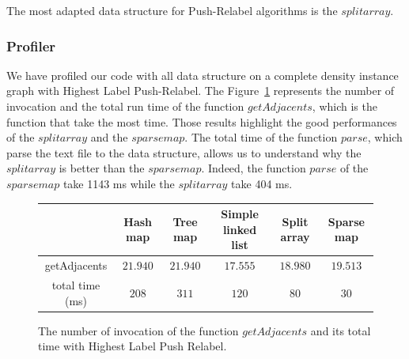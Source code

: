 The most adapted data structure for Push-Relabel algorithms is the $split array$.

\subsubsection{Profiler}
We have profiled our code with all data structure on a complete density instance graph with Highest Label Push-Relabel. The Figure~\ref{fig:pradja} represents the number of invocation and the total run time of the function $getAdjacents$, which is the function that take the most time. Those results highlight the good performances of the $split array$ and the $sparse map$. The total time of the function $parse$, which parse the text file to the data structure, allows us to understand why the $split array$ is better than the $sparse map$. Indeed, the function $parse$ of the $sparse map$ take 1143 ms while the $split array$ take 404 ms. 

\begin{figure}[H]
\centering
\begin{tabular}{|c|c|c|c|c|c|}
	\hline
     & \textbf{Hash map} & \textbf{Tree map} & \textbf{Simple linked list} & \textbf{Split array} & \textbf{Sparse map}\\
     \hline	
   getAdjacents & $21.940$ & $21.940$ & $17.555$ & $18.980$ & $19.513$ \\
   total time (ms) & $208$ & $311$ & $120$ & $80$ & $30$ \\
   \hline
\end{tabular}
\caption{The number of invocation of the function $getAdjacents$ and its total time with Highest Label Push Relabel.}
\label{fig:pradja}
\end{figure}

